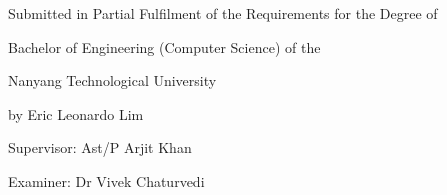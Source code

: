 
\begin{dedication} 

Submitted in Partial Fulfilment of the Requirements for the
Degree of

Bachelor of Engineering (Computer Science) of the

Nanyang Technological University

by Eric Leonardo Lim

\vspace{5mm}

Supervisor: Ast/P Arjit Khan

Examiner: Dr Vivek Chaturvedi

\end{dedication}
